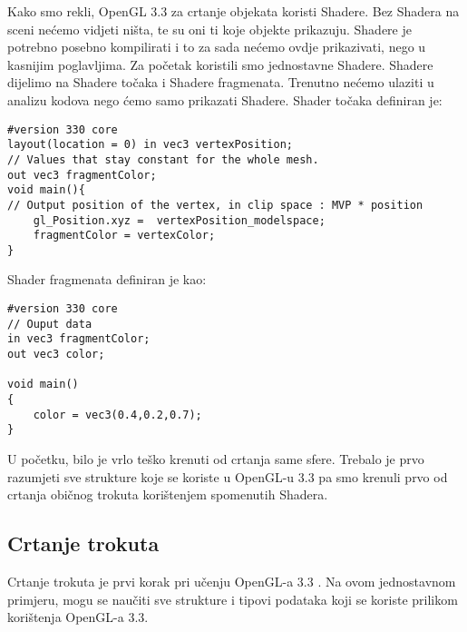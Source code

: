 Kako smo rekli, OpenGL 3.3 za crtanje objekata koristi Shadere. Bez Shadera na sceni nećemo vidjeti ništa, te su oni ti koje objekte prikazuju. Shadere je potrebno posebno kompilirati i to za sada nećemo ovdje prikazivati, nego u kasnijim poglavljima. Za početak koristili smo jednostavne Shadere. Shadere dijelimo na Shadere točaka i Shadere fragmenata\cite{15}. Trenutno nećemo ulaziti u analizu kodova nego ćemo samo prikazati Shadere. Shader točaka definiran je:
\begin{lstlisting}[style = myC++, label = {code:14}, caption = {Jednostavni Shader točaka}]
#version 330 core
layout(location = 0) in vec3 vertexPosition;
// Values that stay constant for the whole mesh.
out vec3 fragmentColor;
void main(){
// Output position of the vertex, in clip space : MVP * position
	gl_Position.xyz =  vertexPosition_modelspace;
	fragmentColor = vertexColor;
}
\end{lstlisting}
Shader fragmenata definiran je kao:
\begin{lstlisting}[style = myC++, label = {code:15}, caption = {Jednostavni Shader fragmenata}]
#version 330 core
// Ouput data
in vec3 fragmentColor;
out vec3 color;

void main()
{
	color = vec3(0.4,0.2,0.7); 
}
\end{lstlisting}

U početku, bilo je vrlo teško krenuti od crtanja same sfere. Trebalo je prvo razumjeti sve strukture koje se koriste u OpenGL-u 3.3 pa smo krenuli prvo od crtanja običnog trokuta korištenjem spomenutih Shadera.

\subsection{Crtanje trokuta}
Crtanje trokuta je prvi korak pri učenju OpenGL-a 3.3 \cite{15}\cite{16}. Na ovom jednostavnom primjeru, mogu se naučiti sve strukture i tipovi podataka koji se koriste prilikom korištenja OpenGL-a 3.3. 

